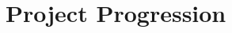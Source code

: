 \chapter{Project Progression}

\clearpage

\clearpage

\clearpage

\clearpage

\clearpage

\clearpage